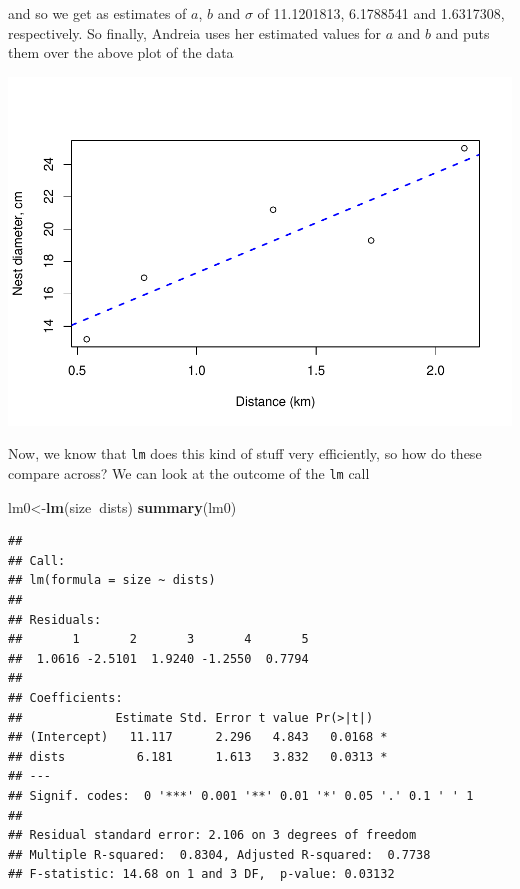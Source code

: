 \documentclass[
]{book}
\newenvironment{Shaded}{\begin{snugshade}}{\end{snugshade}}
\newcommand{\DataTypeTok}[1]{\textcolor[rgb]{0.13,0.29,0.53}{#1}}
\newcommand{\DecValTok}[1]{\textcolor[rgb]{0.00,0.00,0.81}{#1}}
\newcommand{\KeywordTok}[1]{\textcolor[rgb]{0.13,0.29,0.53}{\textbf{#1}}}
\newcommand{\NormalTok}[1]{#1}
\newcommand{\OperatorTok}[1]{\textcolor[rgb]{0.81,0.36,0.00}{\textbf{#1}}}
\newcommand{\StringTok}[1]{\textcolor[rgb]{0.31,0.60,0.02}{#1}}
\begin{document}
and so we get as estimates of \(a\), \(b\) and \(\sigma\) of 11.1201813, 6.1788541 and 1.6317308, respectively. So finally, Andreia uses her estimated values for \(a\) and \(b\) and puts them over the above plot of the data

\begin{Shaded}
\end{Shaded}

\includegraphics{ECOMODbook_files/figure-latex/ch13.29-1.pdf}

Now, we know that \texttt{lm} does this kind of stuff very efficiently, so how do these compare across? We can look at the outcome of the \texttt{lm} call

\begin{Shaded}
\begin{Highlighting}[]
\NormalTok{lm0<-}\KeywordTok{lm}\NormalTok{(size}\OperatorTok{~}\NormalTok{dists)}
\KeywordTok{summary}\NormalTok{(lm0)}
\end{Highlighting}
\end{Shaded}

\begin{verbatim}
## 
## Call:
## lm(formula = size ~ dists)
## 
## Residuals:
##       1       2       3       4       5 
##  1.0616 -2.5101  1.9240 -1.2550  0.7794 
## 
## Coefficients:
##             Estimate Std. Error t value Pr(>|t|)  
## (Intercept)   11.117      2.296   4.843   0.0168 *
## dists          6.181      1.613   3.832   0.0313 *
## ---
## Signif. codes:  0 '***' 0.001 '**' 0.01 '*' 0.05 '.' 0.1 ' ' 1
## 
## Residual standard error: 2.106 on 3 degrees of freedom
## Multiple R-squared:  0.8304,	Adjusted R-squared:  0.7738 
## F-statistic: 14.68 on 1 and 3 DF,  p-value: 0.03132
\end{verbatim}
\end{document}
